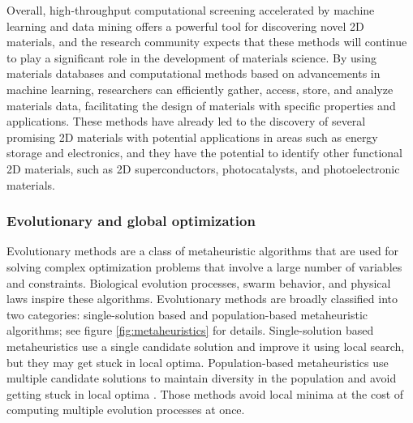
Overall, high-throughput computational screening accelerated by machine learning and data mining offers a powerful tool for discovering novel 2D materials, and the research community expects that these methods will continue to play a significant role in the development of materials science. By using materials databases and computational methods based on advancements in machine learning, researchers can efficiently gather, access, store, and analyze materials data, facilitating the design of materials with specific properties and applications. These methods have already led to the discovery of several promising 2D materials with potential applications in areas such as energy storage and electronics, and they have the potential to identify other functional 2D materials, such as 2D superconductors, photocatalysts, and photoelectronic materials.

\subsubsection{Evolutionary and global optimization}
\label{subsec:Evolutionary}
Evolutionary methods are a class of metaheuristic algorithms that are used for solving complex optimization problems that involve a large number of variables and constraints. Biological evolution processes, swarm behavior, and physical laws inspire these algorithms. Evolutionary methods are broadly classified into two categories: single-solution based and population-based metaheuristic algorithms; see figure \ref{fig:metaheuristics} for details. Single-solution based metaheuristics use a single candidate solution and improve it using local search, but they may get stuck in local optima. Population-based metaheuristics use multiple candidate solutions to maintain diversity in the population and avoid getting stuck in local optima \cite{katochReviewGeneticAlgorithm2021}. Those methods avoid local minima at the cost of computing multiple evolution processes at once.

